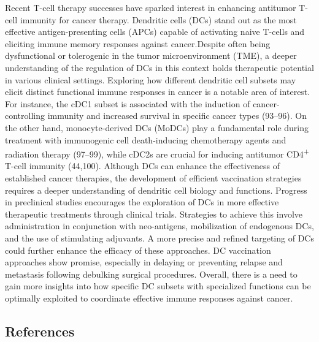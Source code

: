 \documentclass[
]{article}
\begin{document}
Recent T-cell therapy successes have sparked interest in enhancing
antitumor T-cell immunity for cancer therapy. Dendritic cells (DCs)
stand out as the most effective antigen-presenting cells (APCs) capable
of activating naive T-cells and eliciting immune memory responses
against cancer.Despite often being dysfunctional or tolerogenic in the
tumor microenvironment (TME), a deeper understanding of the regulation
of DCs in this context holds therapeutic potential in various clinical
settings. Exploring how different dendritic cell subsets may elicit
distinct functional immune responses in cancer is a notable area of
interest. For instance, the cDC1 subset is associated with the induction
of cancer-controlling immunity and increased survival in specific cancer
types (93--96). On the other hand, monocyte-derived DCs (MoDCs) play a
fundamental role during treatment with immunogenic cell death-inducing
chemotherapy agents and radiation therapy (97--99), while cDC2s are
crucial for inducing antitumor CD4\textsuperscript{+} T-cell immunity
(44,100). Although DCs can enhance the effectiveness of established
cancer therapies, the development of efficient vaccination strategies
requires a deeper understanding of dendritic cell biology and functions.
Progress in preclinical studies encourages the exploration of DCs in
more effective therapeutic treatments through clinical trials.
Strategies to achieve this involve administration in conjunction with
neo-antigens, mobilization of endogenous DCs, and the use of stimulating
adjuvants. A more precise and refined targeting of DCs could further
enhance the efficacy of these approaches. DC vaccination approaches show
promise, especially in delaying or preventing relapse and metastasis
following debulking surgical procedures. Overall, there is a need to
gain more insights into how specific DC subsets with specialized
functions can be optimally exploited to coordinate effective immune
responses against cancer.

\subsection{References}\label{references}
\end{document}

